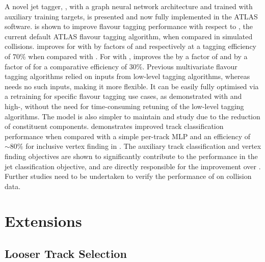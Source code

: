 A novel jet tagger, \GNN, with a graph neural network architecture and trained with auxiliary training targets, is presented and now fully implemented in the ATLAS software.
\GNN is shown to improve flavour tagging performance with respect to \DLr, the current default ATLAS flavour tagging algorithm, when compared in simulated collisions.
\GNN improves \clrej for \ttbarjets with \ttbarpt by factors of \ttbclo and \ttbllo respectively at a \bjet tagging efficiency of $70\%$ when compared with \DLr.
For \Zprimejets with \Zprimept, \GNN improves the \crej by a factor of \zpbclo and \lrej by a factor of \zpbllo for a comparative \bjet efficiency of $30\%$.
Previous multivariate flavour tagging algorithms relied on inputs from low-level tagging algorithms, whereas \GNN needs no such inputs, making it more flexible. It can be easily fully optimised via a retraining for specific flavour tagging use cases, as demonstrated with \ctag and high-\pt \btag, without the need for time-consuming retuning of the low-level tagging algorithms.
The model is also simpler to maintain and study due to the reduction of constituent components.
\GNN demonstrates improved track classification performance when compared with a simple per-track MLP and an efficiency of $\sim80\%$ for inclusive vertex finding in \bjets.
The auxiliary track classification and vertex finding objectives are shown to significantly contribute to the performance in the jet classification objective, and are directly responsible for the improvement over \DLr.
Further studies need to be undertaken to verify the performance of \GNN on collision data.


\section{Extensions}
\subsection{Looser Track Selection}